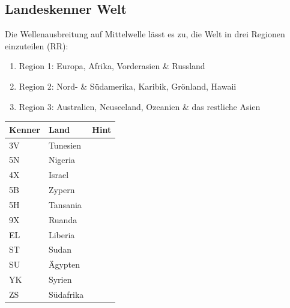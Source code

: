 \documentclass[11pt,BCOR=8.5mm]{scrartcl}
\begin{document}
\subsection{Landeskenner Welt}\label{sec:landeskenner_welt}

Die Wellenausbreitung auf Mittelwelle lässt es zu, die Welt in drei
Regionen einzuteilen (RR):
\begin{enumerate}
  \item Region 1: Europa, Afrika, Vorderasien \& Russland
  \item Region 2: Nord- \& Südamerika, Karibik, Grönland, Hawaii
  \item Region 3: Australien, Neuseeland, Ozeanien \& das restliche
	Asien
\end{enumerate}

  \begin{longtable}{| l | l | l |}
  \hline
  Kenner & Land & Hint \\
  \hline
  \hline
  \endhead
  3V & Tunesien & \\
  \hline
  5N & Nigeria & \\
  \hline
  4X & Israel & \\
  \hline
  5B & Zypern & \\
  \hline
  5H & Tansania & \\
  \hline
  9X & Ruanda & \\
  \hline
  EL & Liberia & \\
  \hline
  ST & Sudan & \\
  \hline
  SU & Ägypten & \\
  \hline
  YK & Syrien & \\
  \hline
  ZS & Südafrika & \\
  \hline
\end{longtable}
\end{document}
